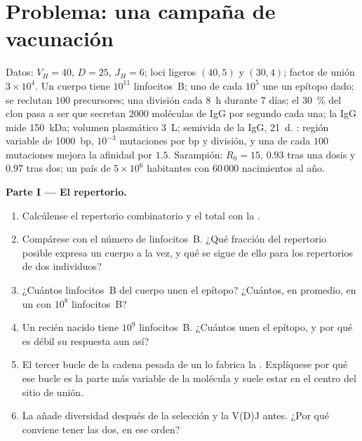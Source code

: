\section{Problema: una campaña de vacunación}

\begin{problem}
\label{pb:b3:adaptive-immunity:1}
Datos: $V_{H} = 40$, $D = 25$, $J_{H} = 6$; loci ligeros $(40, 5)$ y
$(30, 4)$; factor de unión $3\times 10^{4}$. Un cuerpo tiene $10^{11}$
linfocitos~B; uno de cada $10^{5}$ une un epítopo dado; se reclutan $100$
precursores; una división cada \qty{8}{h} durante $7$ días; el
\qty{30}{\%} del clon pasa a ser  que secretan $2000$
moléculas de IgG por segundo cada una; la IgG mide \qty{150}{kDa};
volumen plasmático \qty{3}{L}; semivida de la IgG, \qty{21}{d}. : región variable de \qty{1000}{bp}, $10^{-3}$ mutaciones por bp
y división, y una de cada $100$ mutaciones mejora la afinidad por $1.5$.
Sarampión: $R_{0} = 15$,  $0.93$ tras una dosis y $0.97$
tras dos; un país de $5\times 10^{6}$ habitantes con $60\,000$
nacimientos al año.

\medskip
\noindent\textbf{Parte I --- El repertorio.}
\begin{enumerate}
  \item Calcúlense el repertorio combinatorio y el total con la
        .
  \item Compárese con el número de linfocitos~B. ¿Qué fracción del
        repertorio posible expresa un cuerpo a la vez, y qué se sigue de
        ello para los repertorios de dos individuos?
  \item ¿Cuántos linfocitos~B del cuerpo unen el epítopo? ¿Cuántos, en
        promedio, en un  con $10^{8}$ linfocitos~B?
  \item Un recién nacido tiene $10^{9}$ linfocitos~B. ¿Cuántos unen el
        epítopo, y por qué es débil su respuesta aun así?
  \item El tercer bucle de la cadena pesada de un  lo fabrica
        la . Explíquese por qué ese bucle es la parte
        más variable de la molécula y suele estar en el centro del sitio
        de unión.
  \item La  añade diversidad después de la
        selección y la V(D)J antes. ¿Por qué conviene tener las dos, en
        ese orden?
\end{enumerate}


\end{problem}
